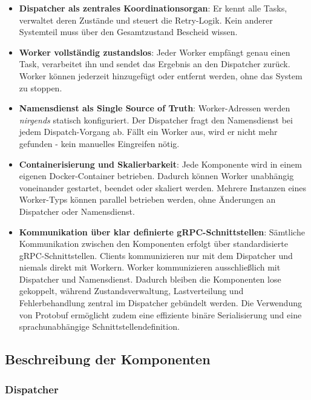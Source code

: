 \begin{itemize}
	\item \textbf{Dispatcher als zentrales Koordinationsorgan}: Er kennt alle
        Tasks, verwaltet deren Zustände und steuert die Retry-Logik.
        Kein anderer Systemteil muss über den Gesamtzustand Bescheid wissen.
\newpage
  	\item \textbf{Worker vollständig zustandslos}: Jeder Worker empfängt genau
        einen Task, verarbeitet ihn und sendet das Ergebnis an den Dispatcher
        zurück. Worker können jederzeit hinzugefügt oder entfernt werden,
        ohne das System zu stoppen.
  	\item \textbf{Namensdienst als Single Source of Truth}: Worker-Adressen
        werden \emph{nirgends} statisch konfiguriert.
        Der Dispatcher fragt den Namensdienst bei jedem Dispatch-Vorgang ab.
        Fällt ein Worker aus, wird er nicht mehr gefunden - kein manuelles
        Eingreifen nötig.
    \item \textbf{Containerisierung und Skalierbarkeit}:
    Jede Komponente wird in einem eigenen Docker-Container betrieben.
    Dadurch können Worker unabhängig voneinander gestartet, beendet oder
    skaliert werden. Mehrere Instanzen eines Worker-Typs können parallel
    betrieben werden, ohne Änderungen an Dispatcher oder Namensdienst.
  	\item \textbf{Kommunikation über klar definierte gRPC-Schnittstellen}:
  	Sämtliche Kommunikation zwischen den Komponenten erfolgt über
  	standardisierte gRPC-Schnittstellen. Clients kommunizieren nur mit dem
  	Dispatcher und niemals direkt mit Workern. Worker kommunizieren
  	ausschließlich mit Dispatcher und Namensdienst. Dadurch bleiben die
  	Komponenten lose gekoppelt, während Zustandsverwaltung,
  	Lastverteilung und Fehlerbehandlung zentral im Dispatcher gebündelt
  	werden. Die Verwendung von Protobuf ermöglicht zudem eine effiziente
  	binäre Serialisierung und eine sprachunabhängige Schnittstellendefinition.
\end{itemize}

\subsection{Beschreibung der Komponenten}

\subsubsection*{Dispatcher}

